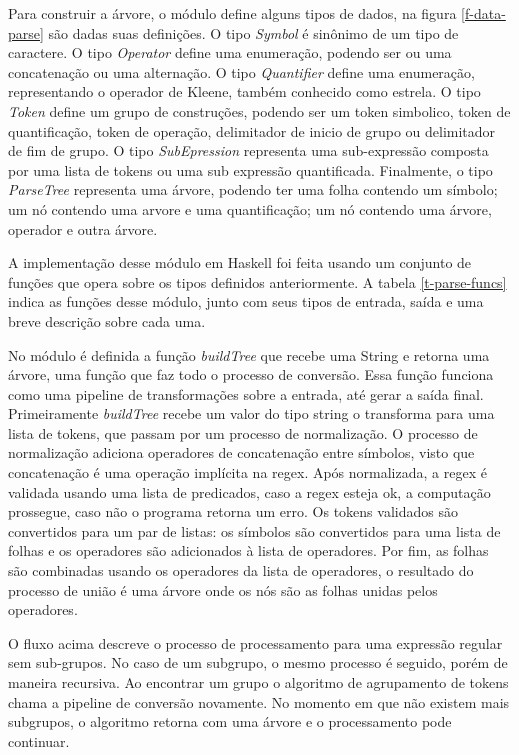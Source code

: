 Para construir a árvore, o módulo define alguns tipos de dados, na figura \ref{f-data-parse} são dadas suas definições.
O tipo \emph{Symbol} é sinônimo de um tipo de caractere.
O tipo \emph{Operator} define uma enumeração, podendo ser ou uma concatenação ou uma alternação.
O tipo \emph{Quantifier} define uma enumeração, representando o operador de Kleene, também conhecido como estrela.
O tipo \emph{Token} define um grupo de construções, podendo ser um token simbolico, token de quantificação, token de operação, delimitador de inicio de grupo ou delimitador de fim de grupo.
O tipo \emph{SubEpression} representa uma sub-expressão composta por uma lista de tokens ou uma sub expressão quantificada.
Finalmente, o tipo \emph{ParseTree} representa uma árvore, podendo ter uma folha contendo um símbolo; um nó contendo uma arvore e uma quantificação; um nó contendo uma árvore, operador e outra árvore.



A implementação desse módulo em Haskell foi feita usando um conjunto de funções que opera sobre os tipos definidos anteriormente.
A tabela \ref{t-parse-funcs} indica as funções desse módulo, junto com seus tipos de entrada, saída e uma breve descrição sobre cada uma.



No módulo é definida a função \emph{buildTree} que recebe uma String e retorna uma árvore, uma função que faz todo o processo de conversão.
Essa função funciona como uma pipeline de transformações sobre a entrada, até gerar a saída final.
Primeiramente \emph{buildTree} recebe um valor do tipo string o transforma para uma lista de tokens, que passam por um processo de normalização.
O processo de normalização adiciona operadores de concatenação entre símbolos, visto que concatenação é uma operação implícita na regex.
Após normalizada, a regex é validada usando uma lista  de predicados, caso a regex esteja ok, a computação prossegue, caso não o programa retorna um erro.
Os tokens validados são convertidos para um par de listas: os símbolos são convertidos para uma lista de folhas e os operadores são adicionados à lista de operadores.
Por fim, as folhas são combinadas usando os operadores da lista de operadores, o resultado do processo de união é uma árvore onde os nós são as folhas unidas pelos operadores.

O fluxo acima descreve o processo de processamento para uma expressão regular sem sub-grupos.
No caso de um subgrupo, o mesmo processo é seguido, porém de maneira recursiva.
Ao encontrar um grupo o algoritmo de agrupamento de tokens chama a pipeline de conversão novamente.
No momento em que não existem mais subgrupos, o algoritmo retorna com uma árvore e o processamento pode continuar.

